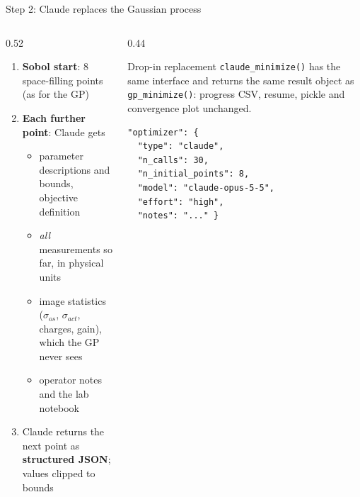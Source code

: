 \documentclass[aspectratio=169,10pt]{beamer}
\begin{document}
\begin{frame}[fragile]{Step 2: Claude replaces the Gaussian process}
  \begin{columns}[T]
    \begin{column}{0.52\textwidth}
      \begin{enumerate}\small
        \item \textbf{Sobol start}: 8 space-filling points (as for the GP)
        \item \textbf{Each further point}: Claude gets
          \begin{itemize}\scriptsize
            \item parameter descriptions and bounds, objective definition
            \item \emph{all} measurements so far, in physical units
            \item image statistics ($\sigma_{os}$, $\sigma_{act}$, charges, gain),
                  which the GP never sees
            \item operator notes and the lab notebook
          \end{itemize}
        \item Claude returns the next point as \textbf{structured JSON};
              values clipped to bounds
      \end{enumerate}
    \end{column}
    \begin{column}{0.44\textwidth}
      \begin{block}{Drop-in replacement}
        \scriptsize
        \texttt{claude\_minimize()} has the same interface and returns the same
        result object as \texttt{gp\_minimize()}: progress CSV, resume, pickle
        and convergence plot unchanged.
      \end{block}
      \vspace{2mm}
\begin{lstlisting}
"optimizer": {
  "type": "claude",
  "n_calls": 30,
  "n_initial_points": 8,
  "model": "claude-opus-5-5",
  "effort": "high",
  "notes": "..." }
\end{lstlisting}
    \end{column}
  \end{columns}
\end{frame}
\end{document}
